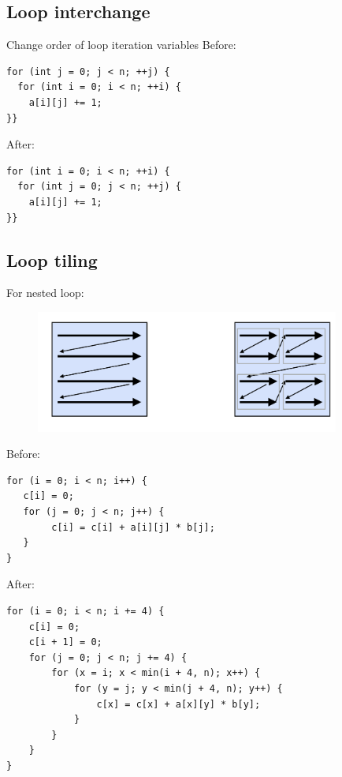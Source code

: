 \documentclass[a4paper]{article}
\theoremstyle{definition}
\begin{document}
\subsection{Loop interchange}
Change order of loop iteration variables
Before:
\begin{verbatim}
for (int j = 0; j < n; ++j) { 
  for (int i = 0; i < n; ++i) {    
    a[i][j] += 1;  
}}
\end{verbatim}
After:
\begin{verbatim}
for (int i = 0; i < n; ++i) {
  for (int j = 0; j < n; ++j) {
    a[i][j] += 1;
}}
\end{verbatim}
\subsection{Loop tiling}
For nested loop:
\begin{figure}[htbp]
  \centering
  \includegraphics[width=10cm]{./img/loop_tiling.png}
  \caption{\cite{cs211lec11}}
\end{figure}
Before:
\begin{verbatim}
for (i = 0; i < n; i++) {  
   c[i] = 0;
   for (j = 0; j < n; j++) {
        c[i] = c[i] + a[i][j] * b[j];  
   }
}
\end{verbatim}
After:
\begin{verbatim}
for (i = 0; i < n; i += 4) {
    c[i] = 0;    
    c[i + 1] = 0;    
    for (j = 0; j < n; j += 4) {      
        for (x = i; x < min(i + 4, n); x++) {        
            for (y = j; y < min(j + 4, n); y++) {        
                c[x] = c[x] + a[x][y] * b[y];   
            }     
        } 
    }  
}
\end{verbatim}
\end{document}
